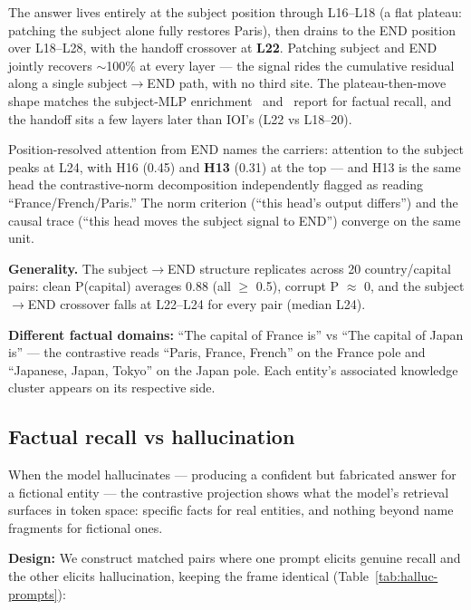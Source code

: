 \documentclass[11pt]{article}
\begin{document}
The answer lives entirely at the subject position through L16--L18 (a flat
plateau: patching the subject alone fully restores Paris), then drains to the
END position over L18--L28, with the handoff crossover at \textbf{L22}. Patching
subject and END jointly recovers $\sim$100\% at every layer --- the signal rides the
cumulative residual along a single subject$\rightarrow$END path, with no third site. The
plateau-then-move shape matches the subject-MLP enrichment~\citet{meng2022}
and~\citet{geva2023} report for factual recall, and the handoff sits a few
layers later than IOI's (L22 vs L18--20).

Position-resolved attention from END names the carriers: attention to the
subject peaks at L24, with H16 (0.45) and \textbf{H13} (0.31) at the top ---
and H13 is the same
head the contrastive-norm decomposition independently flagged as reading
``France/French/Paris.'' The norm criterion (``this head's output differs'') and the
causal trace (``this head moves the subject signal to END'') converge on the same
unit.

\textbf{Generality.} The subject$\rightarrow$END structure replicates across 20
country/capital pairs: clean P(capital) averages 0.88 (all $\ge$ 0.5),
corrupt P $\approx$ 0, and the subject$\rightarrow$END crossover falls at
L22--L24 for every pair (median L24).

\textbf{Different factual domains:} ``The capital of France is'' vs ``The capital of
Japan is'' --- the contrastive reads ``Paris, France, French'' on the France pole
and ``Japanese, Japan, Tokyo'' on the Japan pole. Each entity's associated
knowledge cluster appears on its respective side.

\subsection{Factual recall vs hallucination}

When the model hallucinates --- producing a confident but fabricated answer for
a fictional entity --- the contrastive projection shows what the model's
retrieval surfaces in token space: specific facts for real entities, and
nothing beyond name fragments for fictional ones.

\textbf{Design:} We construct matched pairs where one prompt elicits genuine recall
and the other elicits hallucination, keeping the frame identical (Table~\ref{tab:halluc-prompts}):
\end{document}
